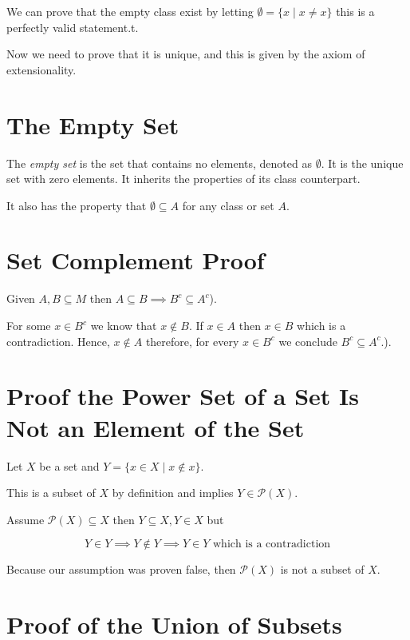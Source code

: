 We can prove that the empty class exist by letting \(\emptyset = \{x \mid x \ne x\}\) this is a perfectly valid statement.t.

Now we need to prove that it is unique, and this is given by the axiom of extensionality.

\QED

\section{The Empty Set}

The \emph{empty set} is the set that contains no elements, denoted as \(\emptyset\). It is the unique set with
zero elements. It inherits the properties of its class counterpart.

It also has the property that \(\emptyset \subseteq A\) for any class or set \(A\).

\section{Set Complement Proof}

Given \(A, B \subseteq M\) then \(A \subseteq B \implies B^c \subseteq A^c\)).

For some \(x \in B^c\) we know that \(x \notin B\). If \(x \in A\) then \(x \in B\) which is a contradiction.
Hence, \(x \notin A\) therefore, for every \(x \in B^c\) we conclude \(B^c \subseteq A^c\).).

\QED

\section{Proof the Power Set of a Set Is Not an Element of the Set}

Let \(X\) be a set and \(Y = \{x \in X \mid x \notin x\}\).

This is a subset of \(X\) by definition and implies \(Y \in \mathcal{P}(X)\).

Assume \(\mathcal{P}(X) \subseteq X\) then \(Y \subseteq X, Y \in X\) but

\[
	Y \in Y \implies Y \notin Y \implies Y \in Y \text{ which is a contradiction}
\]

Because our assumption was proven false, then \(\mathcal{P}(X)\) is not a subset of \(X\).

\QED

\section{Proof of the Union of Subsets}

